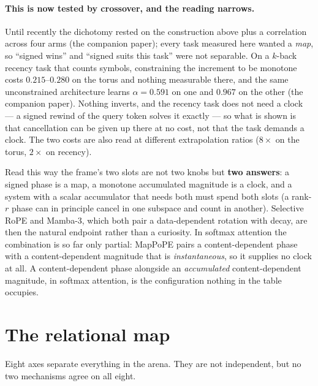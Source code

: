 \documentclass[11pt]{article}
\begin{document}
\paragraph{This is now tested by crossover, and the reading narrows.} Until recently
the dichotomy rested on the construction above plus a correlation across four arms
(the companion paper); every task measured here wanted a \emph{map}, so
``signed wins'' and ``signed suits this task'' were not separable. On a $k$-back
recency task that counts symbols, constraining the increment to be monotone costs
$0.215$--$0.280$ on the torus and nothing measurable there, and the same unconstrained
architecture learns $\alpha = 0.591$ on one and $0.967$ on the other (the companion
paper). Nothing inverts, and the recency task does not need a clock --- a signed
rewind of the query token solves it exactly --- so what is shown is that cancellation
can be given up there at no cost, not that the task demands a clock. The two costs are
also read at different extrapolation ratios ($8\times$ on the torus, $2\times$ on
recency).

\noindent Read this way the frame's two slots are not two knobs but \textbf{two
answers}: a signed phase is a map, a monotone accumulated magnitude is a clock, and a
system with a scalar accumulator that needs both must spend both slots (a rank-$r$
phase can in principle cancel in one subspace and count in another). Selective RoPE
and Mamba-3, which both pair a data-dependent rotation with decay, are then the
natural endpoint rather than a curiosity. In softmax attention the
combination is so far only partial: MapPoPE pairs a content-dependent phase with a
content-dependent magnitude that is \emph{instantaneous}, so it supplies no clock at
all. A content-dependent phase alongside an \emph{accumulated} content-dependent
magnitude, in softmax attention, is the configuration nothing in the table
occupies.



\section{The relational map}
\label{sec:map}

Eight axes separate everything in the arena. They are not independent, but no two
mechanisms agree on all eight.
\end{document}

